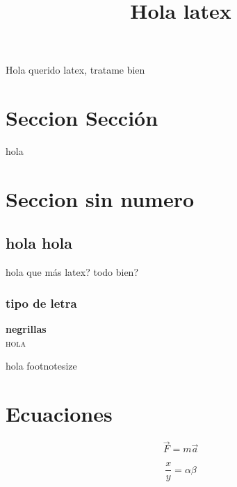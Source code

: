 \documentclass{article}
\title{Hola  latex}
\begin{document}
\date{}
\maketitle

Hola querido latex, tratame bien 

\section{Seccion Secci\'on}
hola 
\section*{Seccion sin numero}

\subsection{hola hola}
hola que m\'as latex? todo bien?
\subsubsection{tipo de letra}

\textbf{negrillas}\\
\textsc{hola}
 
 
\begin{footnotesize}
 hola footnotesize 
\end{footnotesize}


\section{Ecuaciones}

\begin{equation}
\vec{F} = m\vec{a}
\end{equation}


\begin{equation}
\dfrac{x}{y} = \alpha\beta
\end{equation}
\end{document}
